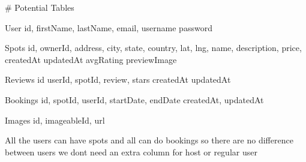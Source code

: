 # Potential Tables


User
    id,
    firstName,
    lastName,
    email,
    username
    password


Spots
    id,
    ownerId,
    address,
    city,
    state,
    country,
    lat,
    lng,
    name,
    description,
    price,
    createdAt
    updatedAt
    avgRating
    previewImage

Reviews
    id
    userId,
    spotId,
    review,
    stars
    createdAt
    updatedAt

Bookings
    id,
    spotId,
    userId,
    startDate,
    endDate
    createdAt,
    updatedAt

Images
    id,
    imageableId,
    url


All the users can have spots and all can do bookings so there are no difference between users
we dont need an extra column for host or regular user